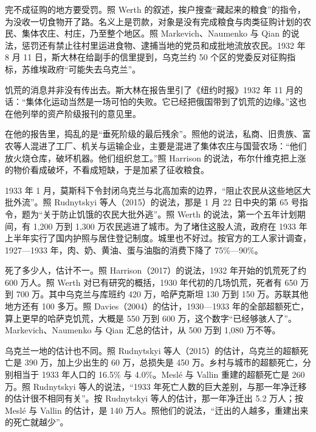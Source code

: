 完不成征购的地方要受罚。照 Werth 的叙述，挨户搜查“藏起来的粮食”的指令，为没收一切食物开了路\cite{werth2016}。名义上是罚款，对象是没有完成粮食与肉类征购计划的农民、集体农庄、村庄，乃至整个地区\cite{werth2016}。照 Markevich、Naumenko 与 Qian 的说法，惩罚还有禁止往村里运进食物、逮捕当地的党员和成批地流放农民\cite{mnq2021}。1932 年 8 月 11 日，斯大林在给副手的信里提到，乌克兰约 50 个区的党委反对征购指标，苏维埃政府“可能失去乌克兰”\cite{mnq2021}。

饥荒的消息并非没有传出去。斯大林在报告里引了《纽约时报》1932 年 11 月的话：“集体化运动当然是一场可怕的失败。它已经把俄国带到了饥荒的边缘。”\cite{stalin1933}这也在他列举的资产阶级报刊的意见里\cite{stalin1933}。

在他的报告里，捣乱的是“垂死阶级的最后残余”\cite{stalin1933}。照他的说法，私商、旧贵族、富农等人混进了工厂、机关与运输企业，主要是混进了集体农庄与国营农场：“他们放火烧仓库，破坏机器。他们组织怠工。”\cite{stalin1933}照 Harrison 的说法，布尔什维克把上涨的物价看成破坏，不看成短缺，于是加紧了征收粮食\cite{harrison2017}。

1933 年 1 月，莫斯科下令封闭乌克兰与北高加索的边界，“阻止农民从这些地区大批外流”\cite{mnq2021}。照 Rudnytskyi 等人（2015）的说法，那是 1 月 22 日中央的第 65 号指令，题为“关于防止饥饿的农民大批外逃”\cite{rudnytskyi2015}。照 Werth 的说法，第一个五年计划期间，有 1,200 万到 1,300 万农民逃进了城市\cite{werth2016}。为了堵住这股人流，政府在 1933 年上半年实行了国内护照与居住登记制度\cite{werth2016}。城里也不好过。按官方的工人家计调查，1927—1933 年，肉、奶、黄油、蛋与油脂的消费下降了 75\%—90\%\cite{werth2016}。

死了多少人，估计不一。照 Harrison（2017）的说法，1932 年开始的饥荒死了约 600 万人\cite{harrison2017}。照 Werth 对已有研究的概括，1930 年代初的几场饥荒，死者有 650 万到 700 万\cite{werth2016}。其中乌克兰与库班约 420 万，哈萨克斯坦 130 万到 150 万\cite{werth2016}。苏联其他地方还有 100 多万\cite{werth2016}。照 Davies（2004）的估计，1930—1933 年的全部超额死亡，算上更早的哈萨克饥荒，大概是 550 万到 600 万，这个数字“已经够骇人了”\cite{davies2004}。Markevich、Naumenko 与 Qian 汇总的估计，从 500 万到 1,080 万不等\cite{mnq2021}。

乌克兰一地的估计也不同。照 Rudnytskyi 等人（2015）的估计，乌克兰的超额死亡是 390 万，加上少出生的 60 万，总损失是 450 万\cite{rudnytskyi2015}。乡村与城市的超额死亡，分别相当于 1933 年人口的 16.5\% 与 4.0\%\cite{rudnytskyi2015}。Meslé 与 Vallin 重建的超额死亡是 260 万\cite{rudnytskyi2015}。照 Rudnytskyi 等人的说法，“1933 年死亡人数的巨大差别，与那一年净迁移的估计很不相同有关”\cite{rudnytskyi2015}。按 Rudnytskyi 等人的估计，那一年净迁出 5.2 万人；按 Meslé 与 Vallin 的估计，是 140 万人\cite{rudnytskyi2015}。照他们的说法，“迁出的人越多，重建出来的死亡就越少”\cite{rudnytskyi2015}。

